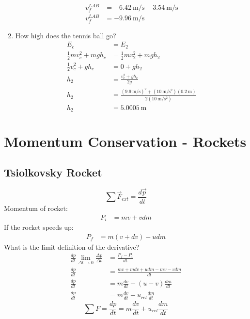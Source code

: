 \documentclass{article}
\begin{document}
\begin{enumerate}[label = \textbf{\arabic*)}]
\begin{align*}
			v_f^{LAB} & = \SI{-6.42}{\meter \per \second} - \SI{3.54}{\meter \per \second} \\
			v_f^{LAB} & = \SI{-9.96}{\meter \per \second}
		\end{align*}
	\item How high does the tennis ball go?
		\begin{align*}
			E_c & = E_2 \\
			\frac{1}{2}mv_c^2 + mgh_c & = \frac{1}{2}mv_2^2 + mgh_2 \\
			\frac{1}{2}v_c^2 + gh_c & = 0 + gh_2 \\
			h_2 & = \frac{v_c^2 + gh_c}{2g} \\
			h_2 & = \frac{(\SI{9.9}{\meter \per \second})^2 + (\SI{10}{\meter \per \second \squared})(\SI{0.2}{\meter})}{2(\SI{10}{\meter \per \second \squared})} \\
			h_2 & = \SI{5.0005}{\meter}
		\end{align*}
\end{enumerate}

\section{Momentum Conservation - Rockets}

\subsection{Tsiolkovsky Rocket}

\begin{equation}
	\sum \vec{F}_{ext} = \frac{d\vec{p}}{dt}
\end{equation}
Momentum of rocket:
\begin{align*}
	P_i & = mv + vdm
\end{align*}
If the rocket speeds up:
\begin{align*}
	P_f & = m(v + dv) + udm
\end{align*}
What is the limit definition of the derivative?
\begin{align*}
	\frac{dp}{dt} \lim_{\Delta t \rightarrow 0} \frac{\Delta p}{\Delta t} & = \frac{P_f - P_i}{dt} \\
	\frac{dp}{dt} & = \frac{mv + mdv + udm - mv - vdm}{dt} \\
	\frac{dp}{dt} & = m\frac{dv}{dt} + (u - v)\frac{dm}{dt} \\
	\frac{dp}{dt} & = m\frac{dv}{dt} + u_{rel}\frac{dm}{dt}
\end{align*}
\begin{equation}
	\sum F = \frac{dp}{dt} = m\frac{dv}{dt} + u_{rel}\frac{dm}{dt}
\end{equation}
\end{document}
